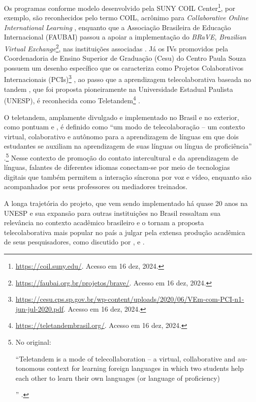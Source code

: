 \documentclass[portuguese]{textolivre}
\begin{document}
Os programas conforme modelo desenvolvido pela SUNY COIL Center\footnote{\url{https://coil.suny.edu/}. Acesso em 16 dez, 2024.}, por exemplo, são reconhecidos pelo termo COIL, acrônimo para  \textit{Collaborative Online International Learning} \cite{rubinguth2015}, enquanto que a Associação Brasileira de Educação Internacional (FAUBAI) passou a apoiar a implementação do \textit{BRaVE, Brazilian Virtual Exchange}\footnote{\url{https://faubai.org.br/projetos/brave/}. Acesso em 16 dez, 2024.}, nas instituições associadas \cite{salomao2020}. Já os IVs promovidos pela Coordenadoria de Ensino Superior de Graduação (Cesu) do Centro Paula Souza possuem um desenho específico que os caracteriza como Projetos Colaborativos Internacionais (PCIs)\footnote{\url{https://cesu.cps.sp.gov.br/wp-content/uploads/2020/06/VEm-com-PCI-n1-jun-jul-2020.pdf}. Acesso em 16 dez, 2024.}  \cite{succi2020}, ao passo que a aprendizagem telecolaborativa baseada no tandem \cite{brammerts1996}, que foi proposta pioneiramente na Universidade Estadual Paulista (UNESP), é reconhecida como Teletandem\footnote{\url{https://teletandembrasil.org/}. Acesso em 16 dez, 2024.} \cite{telles2006a}.

O teletandem, amplamente divulgado e implementado no Brasil e no exterior, como pontuam \textcite{aranha2021} e \textcite{zakir2022}, é definido como “um modo de telecolaboração -- um contexto virtual, colaborativo e autôno\-mo para a aprendizagem de línguas em que dois estudantes se auxiliam na aprendizagem de suas línguas ou língua de proficiência” \cite[p. 604, tradução própria]{telles2015}.\footnote{No original: \begin{english}“Teletandem is 
a mode of telecollaboration -- a virtual, collaborative and autonomous context for learning foreign 
languages in which two students help each other to learn their own languages 
(or language of proficiency)\end{english}” \cite[p. 604]{telles2015}.} Nesse contexto de promoção do contato intercultural e da aprendizagem de línguas, falantes de diferentes idiomas conectam-se por meio de tecnologias digitais que também permitem a interação síncrona por voz e vídeo, enquanto são acompanhados por seus professores ou mediadores treinados.

A longa trajetória do projeto, que vem sendo implementado há quase 20 anos na UNESP \cite{cavalari2018} e sua expansão para outras instituições no Brasil \cite{aranha2021, lopes2022, munoz2022, rampazzamoore2024, reno2024, souza2020} ressaltam sua relevância no contexto acadêmico brasileiro e o tornam a proposta telecolaborativa mais popular no país \cite{barbosa2023} a julgar pela extensa produção acadêmica de seus pesquisadores, como discutido por \textcite{aranha2021}, \textcite{rampazzacunha2021} e \textcite{aranha2022}.
\end{document}

